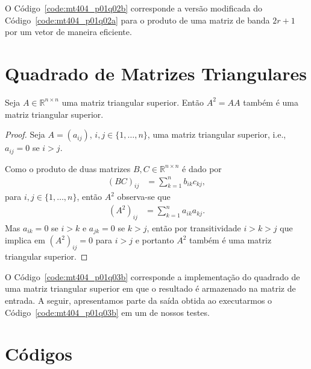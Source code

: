 \documentclass[12pt,a4paper]{article}
\begin{document}
O Código~\ref{code:mt404_p01q02b} corresponde a versão modificada do Código~\ref{code:mt404_p01q02a} para o produto de uma matriz de banda $2r + 1$ por um vetor de maneira eficiente.


\section{Quadrado de Matrizes Triangulares}
\begin{prop}
    Seja $A \in \mathbb{R}^{n \times n}$ uma matriz triangular superior. Então $A^2 = A A$ também é uma matriz triangular superior.
\end{prop}
\begin{proof}
    Seja $A = (a_{ij})$, $i, j \in \{1, \ldots, n\}$, uma matriz triangular superior, i.e., $a_{ij} = 0$ se $i > j$.
    
    Como o produto de duas matrizes $B, C \in \mathbb{R}^{n \times n}$ é dado por
    \begin{align*}
        (B C)_{ij} &= \sum_{k = 1}^n b_{ik} c_{kj},
    \end{align*}
    para $i,j \in \{1, \ldots, n\}$, então $A^2$ observa-se que
    \begin{align*}
        (A^2)_{ij} &= \sum_{k = 1}^n a_{ik} a_{kj}.
    \end{align*}
    Mas $a_{ik} = 0$ se $i > k$ e $a_{jk} = 0$ se $k > j$, então por transitividade $i > k > j$ que implica em $(A^2)_{ij} = 0$ para $i > j$ e portanto $A^2$ também é uma matriz triangular superior.
\end{proof}

O Código~\ref{code:mt404_p01q03b} corresponde a implementação do quadrado de uma matriz triangular superior em que o resultado é armazenado na matriz de entrada. A seguir, apresentamos parte da saída obtida ao executarmos o Código~\ref{code:mt404_p01q03b} em um de nossos testes.
%

\section{C\'{o}digos}




\end{document}
